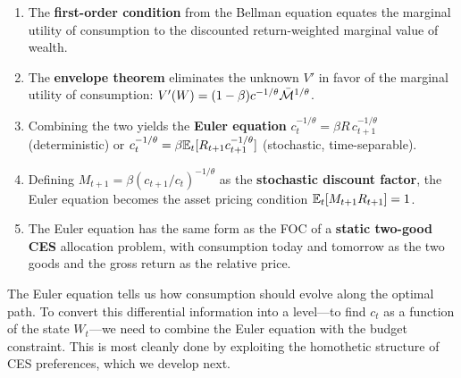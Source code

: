 \begin{calloutimportant}
\begin{enumerate}[label=(\roman*), leftmargin=2em]
    \item The \textbf{first-order condition} from the Bellman equation equates the marginal utility of consumption to the discounted return-weighted marginal value of wealth.
    
    \item The \textbf{envelope theorem} eliminates the unknown $V'$ in favor of the marginal utility of consumption: $V'(W) = (1-\beta) c^{-1/\theta} \bar{\mathcal{M}}^{1/\theta}$.
    
    \item Combining the two yields the \textbf{Euler equation} $c_t^{-1/\theta} = \beta R \, c_{t+1}^{-1/\theta}$ (deterministic) or $c_t^{-1/\theta} = \beta \mathbb{E}_t[R_{t+1} c_{t+1}^{-1/\theta}]$ (stochastic, time-separable).
    
    \item Defining $M_{t+1} = \beta (c_{t+1}/c_t)^{-1/\theta}$ as the \textbf{stochastic discount factor}, the Euler equation becomes the asset pricing condition $\mathbb{E}_t[M_{t+1} R_{t+1}] = 1$.
    
    \item The Euler equation has the same form as the FOC of a \textbf{static two-good CES} allocation problem, with consumption today and tomorrow as the two goods and the gross return as the relative price.
\end{enumerate}
\end{calloutimportant}

The Euler equation tells us how consumption should evolve along the optimal path. To convert this differential information into a level---to find $c_t$ as a function of the state $W_t$---we need to combine the Euler equation with the budget constraint. This is most cleanly done by exploiting the homothetic structure of CES preferences, which we develop next.
